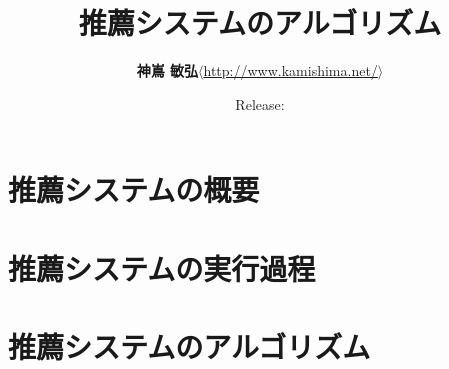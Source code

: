 \documentclass[11pt,a4paper,papersize,oneside]{jsbook}
\title{\LARGE\textbf{推薦システムのアルゴリズム}}
\author{\textbf{神嶌 敏弘}\quad$\langle$\url{http://www.kamishima.net/}$\rangle$}
\date{Release: }
\begin{document}
\frontmatter

\maketitle

\onehalfspacing




\tableofcontents

\mainmatter


\part{推薦システムの概要}
\label{part:overview}




\part{推薦システムの実行過程}
\label{part:process}





\part{推薦システムのアルゴリズム}
\label{part:algorithm}





\backmatter
\singlespacing





\printindex
\end{document}
